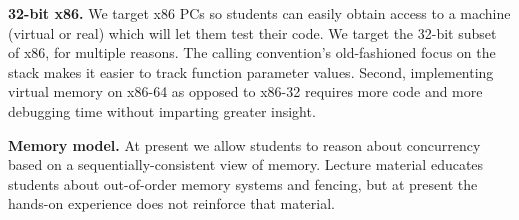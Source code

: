 \textbf{32-bit x86.}
We target x86 PCs %
so students can easily obtain access
to a machine (virtual or real) which will let them
test their code.
%
We target the 32-bit
subset of x86, for multiple reasons.
The calling convention's old-fashioned focus on the stack
makes it easier to track function parameter values.
Second, implementing virtual memory on x86-64 as
opposed to x86-32 requires more code and more
debugging time without imparting greater
insight.

\textbf{Memory model.}
At present we allow students
to reason about concurrency based on a
sequentially-consistent view of
memory.
Lecture material educates students about
out-of-order memory systems
and fencing,
but at present the hands-on experience does not
reinforce that material.

